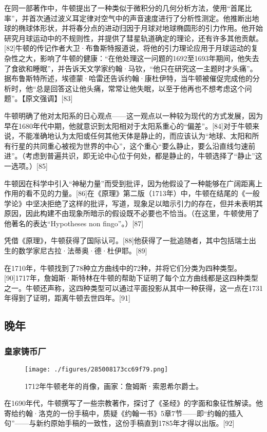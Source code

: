 在同一部著作中，牛顿提出了一种类似于微积分的几何分析方法，使用“首尾比率”，并首次通过波义耳定律对空气中的声音速度进行了分析性测定。他推断出地球的椭球体形状，并将春分点的进动归因于月球对地球椭圆形的引力作用。他开始研究月球运动中的不规则性，并提供了彗星轨道确定的理论，还有许多其他贡献。[82]牛顿的传记作者大卫·布鲁斯特报道说，将他的引力理论应用于月球运动的复杂性之大，影响了牛顿的健康：“在他处理这一问题的1692至1693年期间，他失去了食欲和睡眠”，并告诉天文学家约翰·马钦，“他只在研究这一主题时才头痛”。据布鲁斯特所述，埃德蒙·哈雷还告诉约翰·康杜伊特，当牛顿被催促完成他的分析时，他“总是回答这让他头痛，常常让他失眠，以至于他再也不想考虑这个问题”。【原文强调】[83]

牛顿明确了他对太阳系的日心观点——这一观点以一种较为现代的方式发展，因为早在1680年代中期，他就意识到太阳相对于太阳系重心的“偏差”。[84]对于牛顿来说，不能准确地认为太阳或任何其他天体是静止的，而应该认为“地球、太阳和所有行星的共同重心被视为世界的中心”，这个重心“要么静止，要么沿直线匀速前进”。（考虑到普遍共识，即无论中心位于何处，都是静止的，牛顿选择了“静止”这一选项。）[85]

牛顿因在科学中引入“神秘力量”而受到批评，因为他假设了一种能够在广阔距离上作用的看不见的力量。[86]在《原理》第二版（1713年）中，牛顿在结尾的《一般学论》中坚决拒绝了这样的批评，写道，现象足以暗示引力的存在，但并未表明其原因，因此构建不由现象所暗示的假设既不必要也不恰当。（在这里，牛顿使用了他著名的表达“Hypotheses non fingo”。）[87]

凭借《原理》，牛顿获得了国际认可。[88]他获得了一批追随者，其中包括瑞士出生的数学家尼古拉·法蒂奥·德·杜伊耶。[89]

在1710年，牛顿找到了78种立方曲线中的72种，并将它们分类为四种类型。[90]1717年，詹姆斯·斯特林在牛顿的帮助下证明了每个立方曲线都是这四种类型之一。牛顿还声称，这四种类型可以通过平面投影从其中一种获得，这一点在1731年得到了证明，距离牛顿去世四年。[91]
\subsection{晚年}   
\subsubsection{皇家铸币厂}
\begin{figure}[ht]
\centering
\texttt{[image: ./figures/285008173cc69f79.png]}
\caption{1712年牛顿老年的肖像，画家：詹姆斯·索恩希尔爵士。} \label{fig_Newton_8}
\end{figure}
在1690年代，牛顿撰写了一些宗教著作，探讨了《圣经》的字面和象征性解读。他寄给约翰·洛克的一份手稿中，质疑《约翰一书》5章7节——即“约翰的插入句”——与新约原始手稿的一致性，这份手稿直到1785年才得以出版。[92]

